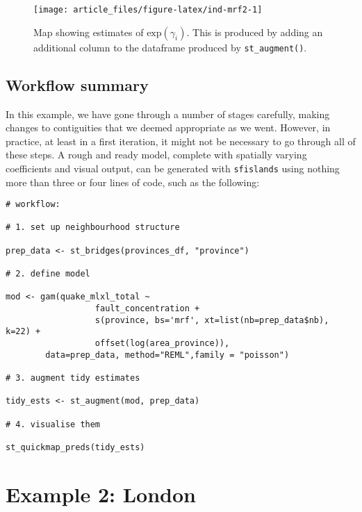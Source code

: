 \begin{figure}

{\centering \texttt{[image: article\_files/figure-latex/ind-mrf2-1]} 

}

\caption{Map showing estimates of \(\text{exp}(\gamma_i).\) This is produced by adding an additional column to the dataframe produced by \texttt{st\_augment()}.}\label{fig:ind-mrf2}
\end{figure}

\hypertarget{workflow-summary}{%
\subsection{Workflow summary}\label{workflow-summary}}

In this example, we have gone through a number of stages carefully, making changes to contiguities that we deemed appropriate as we went. However, in practice, at least in a first iteration, it might not be necessary to go through all of these steps. A rough and ready model, complete with spatially varying coefficients and visual output, can be generated with \texttt{sfislands} using nothing more than three or four lines of code, such as the following:

\begin{verbatim}
# workflow:

# 1. set up neighbourhood structure

prep_data <- st_bridges(provinces_df, "province")

# 2. define model

mod <- gam(quake_mlxl_total ~ 
                  fault_concentration +
                  s(province, bs='mrf', xt=list(nb=prep_data$nb), k=22) +
                  offset(log(area_province)),
        data=prep_data, method="REML",family = "poisson")

# 3. augment tidy estimates

tidy_ests <- st_augment(mod, prep_data)

# 4. visualise them

st_quickmap_preds(tidy_ests)
\end{verbatim}

\hypertarget{example-2-london}{%
\section{Example 2: London}\label{example-2-london}}

